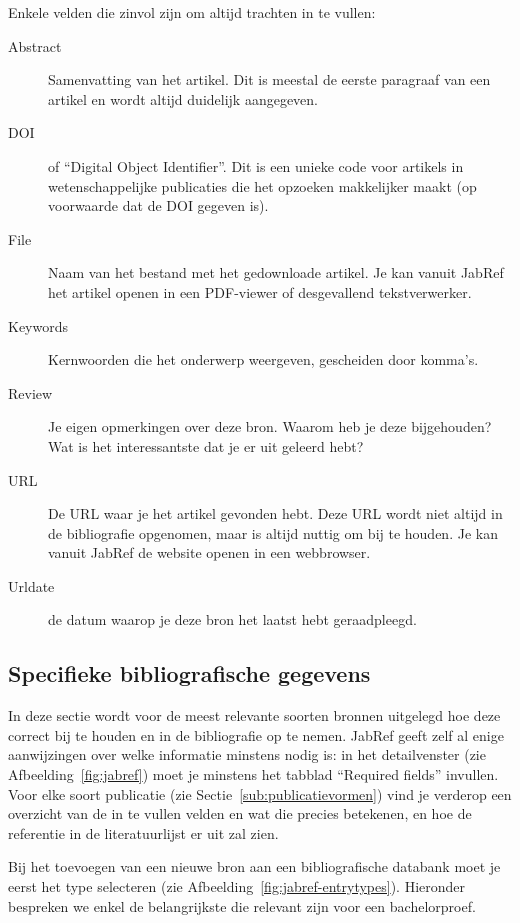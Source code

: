 Enkele velden die zinvol zijn om altijd trachten in te vullen:

\begin{description}
  \item[Abstract] Samenvatting van het artikel. Dit is meestal de eerste paragraaf van een artikel en wordt altijd duidelijk aangegeven.
  \item[DOI] of ``Digital Object Identifier''. Dit is een unieke code voor artikels in wetenschappelijke publicaties die het opzoeken makkelijker maakt (op voorwaarde dat de DOI gegeven is).
  \item[File] Naam van het bestand met het gedownloade artikel. Je kan vanuit JabRef het artikel openen in een PDF-viewer of desgevallend tekstverwerker.
  \item[Keywords] Kernwoorden die het onderwerp weergeven, gescheiden door komma's.
  \item[Review] Je eigen opmerkingen over deze bron. Waarom heb je deze bijgehouden? Wat is het interessantste dat je er uit geleerd hebt?
  \item[URL] De URL waar je het artikel gevonden hebt. Deze URL wordt niet altijd in de bibliografie opgenomen, maar is altijd nuttig om bij te houden. Je kan vanuit JabRef de website openen in een webbrowser.
  \item[Urldate] de datum waarop je deze bron het laatst hebt geraadpleegd.
\end{description}

\subsection{Specifieke bibliografische gegevens}
\label{sub:specifieke_bibliografische_gegevens}

In deze sectie wordt voor de meest relevante soorten bronnen uitgelegd hoe deze correct bij te houden en in de bibliografie op te nemen. JabRef geeft zelf al enige aanwijzingen over welke informatie minstens nodig is: in het detailvenster (zie Afbeelding~\ref{fig:jabref}) moet je minstens het tabblad ``Required fields'' invullen. Voor elke soort publicatie (zie Sectie~\ref{sub:publicatievormen}) vind je verderop een overzicht van de in te vullen velden en wat die precies betekenen, en hoe de referentie in de literatuurlijst er uit zal zien.

Bij het toevoegen van een nieuwe bron aan een bibliografische databank moet je eerst het type selecteren (zie Afbeelding~\ref{fig:jabref-entrytypes}). Hieronder bespreken we enkel de belangrijkste die relevant zijn voor een bachelorproef.

